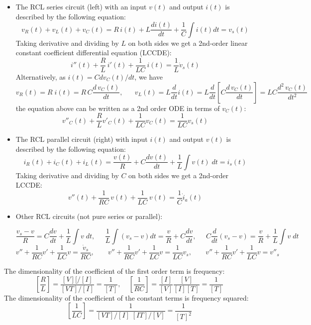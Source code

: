 \begin{itemize}
\item The RCL series circuit (left) with an input $v(t)$ and output $i(t)$
  is described by the following equation:
  \[ 
  v_R(t)+v_L(t)+v_C(t)=R\,i(t)+L\frac{di(t)}{dt}+\frac{1}{C}\int i(t) dt=v_s(t)
  \]
  Taking derivative and dividing by $L$ on both sides we get a 2nd-order
  linear constant coefficient differential equation (LCCDE):
  \[
  i''(t)+\frac{R}{L}\,i'(t)+\frac{1}{LC}\,i(t)=\frac{1}{L}\dot{v}_s(t) 
  \]
  Alternatively, as $i(t)=C dv_C(t)/dt$, we have
  \[ 
  v_R(t)=R\;i(t)=R\,C\frac{d\,v_C(t)}{dt},\;\;\;\;\;\;
  v_L(t)=L\frac{d}{dt}i(t)=L\frac{d}{dt}\left[C\frac{d\,v_C(t)}{dt} \right]
  =LC\frac{d^2\,v_C(t)}{dt^2}
  \]
  the equation above can be written as a 2nd order ODE in terms of $v_C(t)$:
  \[ 
  v''_C(t)+\frac{R}{L} v'_C(t)+\frac{1}{LC}v_C(t)
  =\frac{1}{LC}v_s(t)
  \]
\item The RCL parallel circuit (right) with input $i(t)$ and output $v(t)$
  is described by the following equation:
  \[
  i_R(t)+i_C(t)+i_L(t)=\frac{v(t)}{R}+C\frac{dv(t)}{dt}+\frac{1}{L}\int v(t)\;dt 
  =i_s(t) 
  \]
  Taking derivative and dividing by $C$ on both sides we get a 2nd-order 
  LCCDE:
  \[
  v''(t)+\frac{1}{RC}\,v(t)+\frac{1}{LC}\,v(t)=\frac{1}{C}\dot{i}_a(t) 
  \]

\item Other RCL circuits (not pure series or parallel):

  \[
  \frac{v_s-v}{R} = C\frac{dv}{dt}+\frac{1}{L} \int v\;dt,
  \;\;\;\;\;
  \frac{1}{L}\int (v_s-v)dt = \frac{v}{R}+C\frac{dv}{dt},
  \;\;\;\;\;
  C\frac{d}{dt} (v_s-v) = \frac{v}{R}+\frac{1}{L} \int v\;dt
  \]
  \[
  v''+\frac{1}{RC} v'+\frac{1}{LC}v=\frac{\dot{v}_s}{RC},
  \;\;\;\;\;\;\;
  v''+\frac{1}{RC} v'+\frac{1}{LC}v=\frac{1}{LC}v_s,
  \;\;\;\;\;\;\;
  v''+\frac{1}{RC} v'+\frac{1}{LC}v=v''_s
  \]
\end{itemize}

The dimensionality of the coefficient of the first order term is
frequency:
\[
\left[\frac{R}{L}\right]=\frac{[V][/[I]}{[VT]/[I]}=\frac{1}{[T]},
\;\;\;\;
\left[\frac{1}{RC}\right]=\frac{[I]}{[V]}\frac{[V]}{[I][T]}=\frac{1}{[T]}
\]
The dimensionality of the coefficient of the constant terms is
frequency squared:
\[
\left[\frac{1}{LC}\right]=\frac{1}{[VT]/[I]\;[IT]/[V]}=\frac{1}{[T]^2}
\]

